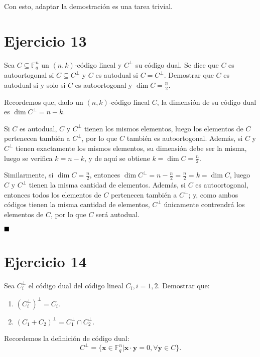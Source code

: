 Con esto, adaptar la demostración es una tarea trivial.

\section{Ejercicio 13}

\begin{formulationBox}
	Sea $C \subseteq \mathbb{F}_q^n$ un $(n, k)$-código lineal y $C^\perp$ su código dual. Se dice que $C$ es autoortogonal si $C \subseteq C^\perp$ y $C$ es autodual si $C = C^\perp$. Demostrar que $C$ es autodual si y solo si $C$ es autoortogonal y $\dim C = \frac{n}{2}$.
\end{formulationBox}

Recordemos que, dado un $(n, k)$-código lineal $C$, la dimensión de su código dual es $\dim C^\perp = n-k$.

Si $C$ es autodual, $C$ y $C^\perp$ tienen los mismos elementos, luego los elementos de $C$ pertenecen también a $C^\perp$, por lo que $C$ también es autoortogonal. Además, si $C$ y $C^\perp$ tienen exactamente los mismos elementos, su dimensión debe ser la misma, luego se verifica $k = n-k$, y de aquí se obtiene $k = \dim C = \frac{n}{2}$.

Similarmente, si $\dim C = \frac{n}{2}$, entonces $\dim C^\perp = n - \frac{n}{2} = \frac{n}{2} = k = \dim C$, luego $C$ y $C^\perp$ tienen la misma cantidad de elementos. Además, si $C$ es autoortogonal, entonces todos los elementos de $C$ pertenecen también a $C^\perp$; y, como ambos códigos tienen la misma cantidad de elementos, $C^\perp$ únicamente contrendrá los elementos de $C$, por lo que $C$ será autodual.

$\qed$

\section{Ejercicio 14}

\begin{formulationBox}
	Sea $C_i^\perp$ el código dual del código lineal $C_i, i=1, 2.$ Demostrar que:
	\begin{enumerate}[label=\alph*)]
		\item $(C_i^\perp)^\perp = C_i$.
		\item $(C_1 + C_2)^\perp = C_1^\perp \cap C_2^\perp$.
	\end{enumerate}
\end{formulationBox}

Recordemos la definición de código dual:
\[C^\perp = \{\textbf{x} \in \mathbb{F}_q^n | \textbf{x}\cdot\textbf{y} = 0, \forall\textbf{y} \in C\}.\]

